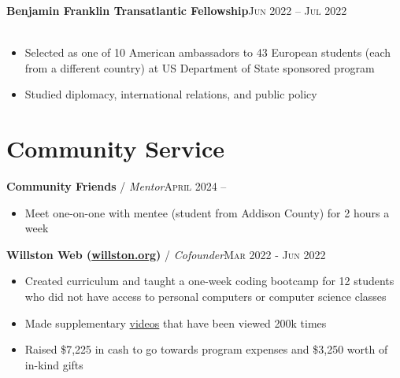 \documentclass[12pt, a4paper]{article}
\begin{document}
\textbf{Benjamin Franklin Transatlantic Fellowship}\hfill\textsc{Jun 2022 -- Jul 2022}\\\
\begin{itemize}
    \vspace{-8mm}
    \item Selected as one of 10 American ambassadors to 43 European students (each from a different country) at US Department of State sponsored program
    \item Studied diplomacy, international relations, and public policy
\end{itemize}


\vspace{-8mm}
\section*{Community Service}
\vspace{-2mm}

\textbf{Community Friends} / \textit{Mentor}\hfill\textsc{April 2024 --}\\
\begin{itemize}
    \vspace{-8mm}
    \item Meet one-on-one with mentee (student from Addison County) for 2 hours a week
\end{itemize}

\textbf{Willston Web (\href{https://willston.org}{willston.org})} / \textit{Cofounder}\hfill\textsc{Mar 2022 - Jun 2022}\\
\begin{itemize}
    \vspace{-8mm}
    \item Created curriculum and taught a one-week coding bootcamp for 12 students who did not have access to personal computers or computer science classes
    \item Made supplementary \href{https://youtube.com/JonathanBuchh}{videos} that have been viewed 200k times
    \item Raised \$7,225 in cash to go towards program expenses and \$3,250 worth of in-kind gifts
\end{itemize}
\end{document}
